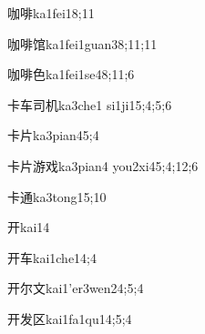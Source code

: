 
\begin{verbete}{咖啡}{ka1fei1}{8;11}
\end{verbete}

\begin{verbete}{咖啡馆}{ka1fei1guan3}{8;11;11}
\end{verbete}

\begin{verbete}{咖啡色}{ka1fei1se4}{8;11;6}
\end{verbete}

\begin{verbete}{卡车司机}{ka3che1 si1ji1}{5;4;5;6}
\end{verbete}

\begin{verbete}{卡片}{ka3pian4}{5;4}
\end{verbete}

\begin{verbete}{卡片游戏}{ka3pian4 you2xi4}{5;4;12;6}
\end{verbete}

\begin{verbete}{卡通}{ka3tong1}{5;10}
\end{verbete}

\begin{verbete}{开}{kai1}{4}
\end{verbete}

\begin{verbete}{开车}{kai1che1}{4;4}
\end{verbete}

\begin{verbete}{开尔文}{kai1'er3wen2}{4;5;4}
\end{verbete}

\begin{verbete}{开发区}{kai1fa1qu1}{4;5;4}
\end{verbete}

